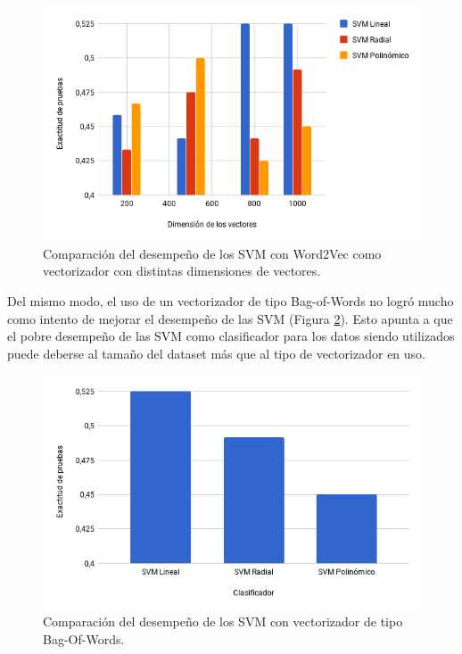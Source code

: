 \documentclass[conference]{IEEEtran}
\begin{document}
        \begin{figure}[htbp]
            \centerline{\includegraphics[width=\linewidth]{figuras/acc_svm_w2v.png}}
            \captionsetup{justification=centering}
            \caption{Comparación del desempeño de los SVM con Word2Vec como vectorizador con distintas dimensiones de vectores.}
            \label{fig:acc_svm_w2v}
        \end{figure}
    
        Del mismo modo, el uso de un vectorizador de tipo Bag-of-Words no logró mucho como intento de mejorar el desempeño de las SVM (Figura \ref{fig:acc_svm_cv}). Esto apunta a que el pobre desempeño de las SVM como clasificador para los datos siendo utilizados puede deberse al tamaño del dataset más que al tipo de vectorizador en uso.
        
        \begin{figure}[htbp]
            \centerline{\includegraphics[width=\linewidth]{figuras/acc_svm_cv.png}}
            \captionsetup{justification=centering}
            \caption{Comparación del desempeño de los SVM con vectorizador de tipo Bag-Of-Words.}
            \label{fig:acc_svm_cv}
        \end{figure}
    
\end{document}
